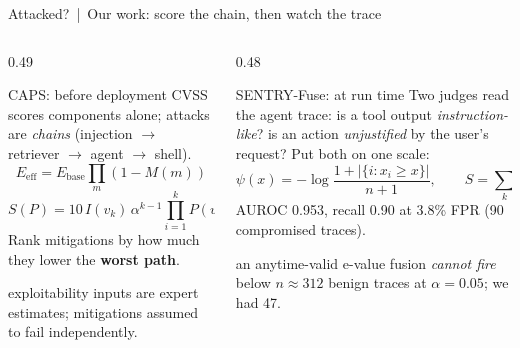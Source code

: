 \documentclass[aspectratio=169,10pt]{beamer}
\begin{document}
\begin{frame}{Attacked? \,|\, Our work: score the chain, then watch the trace}
\begin{columns}[T]
\begin{column}{0.49\textwidth}
\begin{block}{CAPS: before deployment}
{\footnotesize CVSS scores components alone; attacks are \emph{chains} (injection \(\to\) retriever \(\to\) agent \(\to\) shell).
\[E_{\text{eff}}=E_{\text{base}}\prod_{m}(1-M(m))\]\[S(P)=10\,I(v_k)\,\alpha^{k-1}\prod_{i=1}^{k}P(v_i)\]
Rank mitigations by how much they lower the \textbf{worst path}.}
\end{block}
{\footnotesize{} exploitability inputs are expert estimates; mitigations assumed to fail independently.}
\end{column}
\begin{column}{0.48\textwidth}
\begin{block}{SENTRY-Fuse: at run time}
{\footnotesize Two judges read the agent trace: is a tool output \emph{instruction-like}? is an action \emph{unjustified} by the user's request? Put both on one scale:
\[\psi(x)=-\log\frac{1+|\{i:x_i\ge x\}|}{n+1},\qquad S=\textstyle\sum_k\psi_k\]
AUROC 0.953, recall 0.90 at 3.8\% FPR (90 compromised traces).}
\end{block}
{\footnotesize{} an anytime-valid e-value fusion \emph{cannot fire} below \(n\approx312\) benign traces at \(\alpha=0.05\); we had 47.}
\end{column}
\end{columns}
\end{frame}
\end{document}

